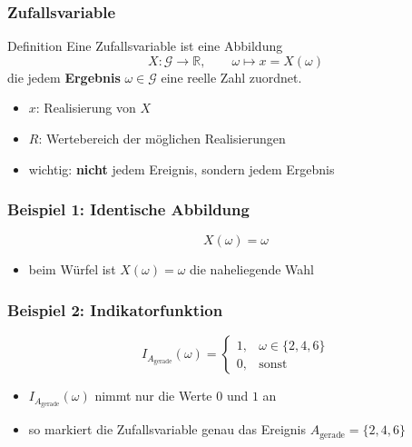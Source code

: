 \documentclass[aspectratio=169,professionalfonts]{beamer}
\begin{document}
\begin{frame}
  \frametitle{Zufallsvariable}

  \begin{block}{Definition}
    Eine Zufallsvariable ist eine Abbildung
    \[
      X:\mathcal G\to \mathbb R,\qquad \omega \mapsto x=X(\omega)
    \]
    die jedem \textbf{Ergebnis} \(\omega\in\mathcal G\) eine reelle Zahl zuordnet.
  \end{block}

  \vspace{0.3cm}

  \begin{itemize}
    \item \(x\): Realisierung von \(X\)
    \item \(R\): Wertebereich der möglichen Realisierungen
    \item wichtig: \textbf{nicht} jedem Ereignis, sondern jedem Ergebnis
  \end{itemize}
\end{frame}

\begin{frame}
  \frametitle{Beispiel 1: Identische Abbildung}

  \[
    X(\omega)=\omega
  \]

  \begin{center}
    
  \end{center}

  \vspace{0.1cm}

  \begin{itemize}
    \item beim Würfel ist \(X(\omega)=\omega\) die naheliegende Wahl
  \end{itemize}
\end{frame}

\begin{frame}
  \frametitle{Beispiel 2: Indikatorfunktion}

  \[
    I_{A_{\mathrm{gerade}}}(\omega)=
    \begin{cases}
      1,& \omega\in\{2,4,6\}\\
      0,& \text{sonst}
    \end{cases}
  \]

  \begin{center}
    
  \end{center}

  \vspace{0.2cm}

  \begin{itemize}
    \item \(I_{A_{\mathrm{gerade}}}(\omega)\) nimmt nur die Werte \(0\) und \(1\) an
    \item so markiert die Zufallsvariable genau das Ereignis \(A_{\mathrm{gerade}}=\{2,4,6\}\)
  \end{itemize}
\end{frame}
\end{document}
